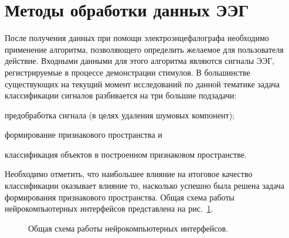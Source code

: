 \documentclass[12pt,a4paper,oneside,fleqn,leqno]{article}
\begin{document}
\newpage
\section{Методы обработки данных ЭЭГ}
	\par После получения данных при помощи электроэнцефалографа необходимо применение алгоритма, позволяющего определить желаемое для пользователя действие. Входными данными для этого алгоритма являются сигналы ЭЭГ, регистрируемые в процессе демонстрации стимулов. В большинстве существующих на текущий момент исследований по данной тематике задача классификации сигналов разбивается на три большие подзадачи:
\begin{inparaenum}[(1)]
\item предобработка сигнала (в целях удаления шумовых компонент);
\item формирование признакового пространства и 
\item классификация объектов в построенном признаковом пространстве.
\end{inparaenum} Необходимо отметить, что наибольшее влияние на итоговое качество классификации оказывает влияние то, насколько успешно была решена задача формирования признакового пространства. Общая схема работы нейрокомпьютерных интерфейсов представлена на рис.~\ref{bci}.

	\begin{figure}[h!]
	\caption{Общая схема работы нейрокомпьютерных интерфейсов.}
	\label{bci}
	\end{figure}
\end{document}
